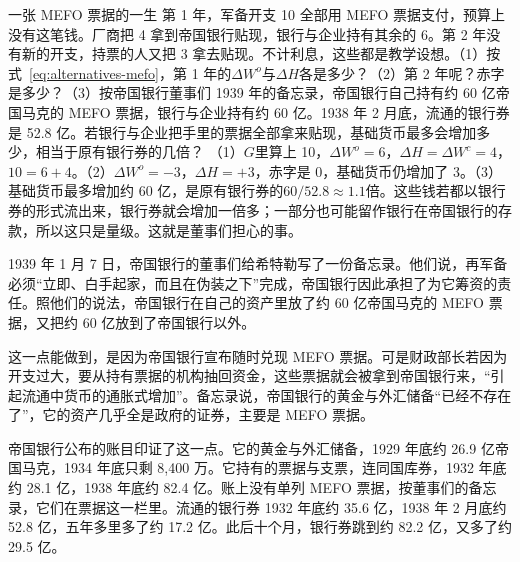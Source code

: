 \begin{example}{一张 MEFO 票据的一生}\label{ex:alternatives-mefo}
第 1 年，军备开支 10 全部用 MEFO 票据支付，预算上没有这笔钱。厂商把 4 拿到帝国银行贴现，银行与企业持有其余的 6。第 2 年没有新的开支，持票的人又把 3 拿去贴现。不计利息，这些都是教学设想。（1）按式~\eqref{eq:alternatives-mefo}，第 1 年的$\Delta W^{o}$与$\Delta H$各是多少？（2）第 2 年呢？赤字是多少？（3）按帝国银行董事们 1939 年的备忘录，帝国银行自己持有约 60 亿帝国马克的 MEFO 票据，银行与企业持有约 60 亿。1938 年 2 月底，流通的银行券是 52.8 亿。若银行与企业把手里的票据全部拿来贴现，基础货币最多会增加多少，相当于原有银行券的几倍？
\solution （1）$G$里算上 10，$\Delta W^{o}=6$，$\Delta H=\Delta W^{c}=4$，$10=6+4$。（2）$\Delta W^{o}=-3$，$\Delta H=+3$，赤字是 0，基础货币仍增加了 3。（3）基础货币最多增加约 60 亿，是原有银行券的$60/52.8\approx1.1$倍。这些钱若都以银行券的形式流出来，银行券就会增加一倍多；一部分也可能留作银行在帝国银行的存款，所以这只是量级。这就是董事们担心的事。
\end{example}

1939 年 1 月 7 日，帝国银行的董事们给希特勒写了一份备忘录\cite{nca1946g}。他们说，再军备必须“立即、白手起家，而且在伪装之下”完成，帝国银行因此承担了为它筹资的责任\cite{nca1946g}。照他们的说法，帝国银行在自己的资产里放了约 60 亿帝国马克的 MEFO 票据，又把约 60 亿放到了帝国银行以外\cite{nca1946g}。

这一点能做到，是因为帝国银行宣布随时兑现 MEFO 票据\cite{nca1946g}。可是财政部长若因为开支过大，要从持有票据的机构抽回资金，这些票据就会被拿到帝国银行来，“引起流通中货币的通胀式增加”\cite{nca1946g}。备忘录说，帝国银行的黄金与外汇储备“已经不存在了”，它的资产几乎全是政府的证券，主要是 MEFO 票据\cite{nca1946g}。

帝国银行公布的账目印证了这一点。它的黄金与外汇储备，1929 年底约 26.9 亿帝国马克，1934 年底只剩 8,400 万\cite{bms1943}。它持有的票据与支票，连同国库券，1932 年底约 28.1 亿，1938 年底约 82.4 亿\cite{bms1943}。账上没有单列 MEFO 票据，按董事们的备忘录，它们在票据这一栏里\cite{nca1946g}。流通的银行券 1932 年底约 35.6 亿，1938 年 2 月底约 52.8 亿，五年多里多了约 17.2 亿\cite{bms1943}。此后十个月，银行券跳到约 82.2 亿，又多了约 29.5 亿\cite{bms1943}。


